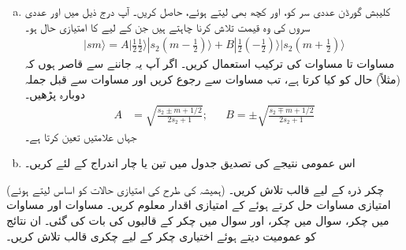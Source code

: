 \begin{enumerate}[a.]
\item 
 کلیبش گورڈن عددی سر کو،  اور  کچھ بھی لیتے ہوئے، حاصل کریں۔ آپ درج ذیل میں  اور  عددی سروں کی وہ قیمت تلاش کرنا چاہتے ہیں جن کے لیے کا امتیازی حال  ہو۔ 
\begin{align*}
 |sm \rangle=A|\tfrac{1}{2}\tfrac{1}{2}\rangle|s_2(m-\tfrac{1}{2})\rangle+B|\tfrac{1}{2}(-\tfrac{1}{2})\rangle|s_2(m+\tfrac{1}{2})\rangle
\end{align*} 
مساوات  تا مساوات  کی ترکیب استعمال کریں۔ اگر آپ یہ جاننے سے قاصر ہوں
 کہ (مثلاً)  حال  کو کیا کرتا ہے، تب مساوات  سے رجوع کریں اور مساوات  سے قبل جملہ دوبارہ پڑھیں۔ 
\begin{align*}
 A&=\sqrt{\frac{s_2\pm m+1/2}{2s_2+1}}; && B=\pm \sqrt{\frac{s_2\mp m+1/2}{2s_2+1}} 
\end{align*}
جہاں  علامتیں تعین کرتا ہے۔
\item 
اس عمومی نتیجے کی تصدیق جدول  میں تین یا چار اندراج کے لئے کریں۔
\end{enumerate}
(ہمیشہ کی طرح  کی امتیازی حالات کو اساس لیتے ہوئے) چکر ذرہ کے لیے قالب  تلاش کریں۔ امتیازی مساوات حل کرتے ہوئے  کے امتیازی اقدار معلوم کریں۔
مساوات  اور مساوات  میں  چکر، سوال  میں  چکر، اور سوال  میں  چکر کے قالبوں کی بات کی گئی۔ ان نتائج کو عمومیت دیتے ہوئے اختیاری  چکر کے لیے چکری قالب تلاش کریں۔
